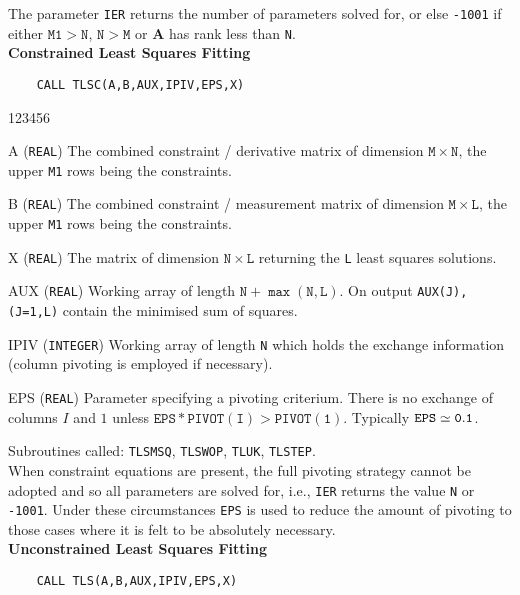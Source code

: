 The parameter {\tt IER} returns the number of parameters solved for,
or else {\tt -1001} if either $\mathtt{M1>N}$,
$\mathtt{N>M}$ or {\bf A} has rank less than {\tt N}. \\[3mm]
{\bf Constrained Least Squares Fitting}
\begin{verbatim}
    CALL TLSC(A,B,AUX,IPIV,EPS,X)
\end{verbatim}
\begin{DLtt}{123456}
\item[A] ({\tt REAL}) The combined constraint / derivative matrix of
dimension $\mathtt{M \times N}$, the upper {\tt M1} rows being the
constraints.
\item[B] ({\tt REAL}) The combined constraint / measurement matrix of
dimension $\mathtt{M \times L}$, the upper {\tt M1} rows being the
constraints.
\item[X] ({\tt REAL}) The matrix of dimension $\mathtt{N \times L}$
returning the {\tt L} least squares solutions.
\item[AUX] ({\tt REAL}) Working array of length
$\mathtt{N+\max(N,L)}$. On output {\tt AUX(J),(J=1,L)}
contain the minimised sum of squares.
\item[IPIV] ({\tt INTEGER}) Working array of length {\tt N} which holds
the exchange information (column pivoting is employed if necessary).
\item[EPS] ({\tt REAL}) Parameter specifying a pivoting criterium.
There is no exchange of columns $I$ and $1$ unless
$\mathtt{EPS*PIVOT(I) > PIVOT(1)}$. Typically ${\tt EPS \simeq 0.1}$.
\end{DLtt}
Subroutines called: {\tt TLSMSQ}, {\tt TLSWOP}, {\tt TLUK},
{\tt TLSTEP}.\\[3mm]
When constraint equations are present, the full pivoting
strategy cannot be adopted and so all parameters are solved for,
i.e., {\tt IER} returns the value {\tt N} or {\tt -1001}. Under these
circumstances {\tt EPS} is used to reduce the amount of pivoting to
those cases where it is felt to be absolutely necessary. \\[3mm]
\newpage
{\bf Unconstrained Least Squares Fitting}
\begin{verbatim}
    CALL TLS(A,B,AUX,IPIV,EPS,X)
\end{verbatim}
